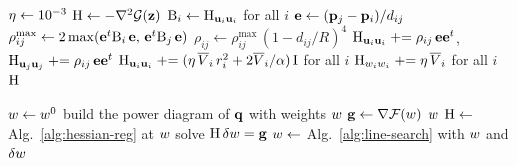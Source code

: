 \documentclass[main.tex]{subfiles}
\begin{document}
\begin{algorithm}[H]
  \caption{Regularized negated Hessian of $\jointdual_\alpha$, $\jointdual$, or $\dualenergy$ (\S\ref{sec:implementation}).}
  \label{alg:hessian-reg}
  \begin{algorithmic}[1]
    \Require {}
    \State $\eta \gets 10^{-3}$
    \State $\mathrm{H} \gets -\nabla^2\mathcal{G}(\mathbf{z})$ \Comment{\eqref{eq:appendix-blocks-off}, \eqref{eq:appendix-blocks-diag}}
    \State $\mathrm{B}_i \gets \mathrm{H}_{\mathbf{u}_i\mathbf{u}_i}$ for all $i$ 
      \State $\mathbf{e} \gets (\mathbf{p}_j - \mathbf{p}_i) / d_{ij}$
      \State $\rho^{\max}_{ij} \gets 2 \max(\mathbf{e}^{t}\mathrm{B}_i\,\mathbf{e},\, \mathbf{e}^{t}\mathrm{B}_j\,\mathbf{e})$
      \State $\rho_{ij} \gets \rho^{\max}_{ij}\,(1 - d_{ij}/R)^4$ \Comment{\eqref{eq:results-pair-reg}}
      \State $\mathrm{H}_{\mathbf{u}_i\mathbf{u}_i} \mathrel{+}= \rho_{ij}\,\mathbf{e}\mathbf{e}^{t}$, \ $\mathrm{H}_{\mathbf{u}_j\mathbf{u}_j} \mathrel{+}= \rho_{ij}\,\mathbf{e}\mathbf{e}^{t}$
    \EndFor
    \State $\mathrm{H}_{\mathbf{u}_i\mathbf{u}_i} \mathrel{+}= (\eta\,\overline{V}_i\,r_i^2 + 2\overline{V}_i/\alpha)\,\mathrm{I}$ for all $i$ 
    \State $\mathrm{H}_{w_iw_i} \mathrel{+}= \eta\,\overline{V}_i$ for all $i$ 
    \State \Return $\mathrm{H}$
  \end{algorithmic}
\end{algorithm}

\begin{algorithm}[H]
  \caption{Newton solve of $\dualenergy$.}
  \label{alg:volume}
  \begin{algorithmic}[1]
    \Require {}
    \State $w \gets w^0$
    \State build the power diagram of $\mathbf{q}$ with weights $w$
      \State $\mathbf{g} \gets \nabla\mathcal{F}(w)$ \Comment{\eqref{eq:volume-dual}}
      \If{$\varepsilon_\weight \le \tol$} \Comment{\eqref{eq:results-termination}}
        \State \Return $w$
      \EndIf
      \State $\mathrm{H} \gets$ Alg.~\ref{alg:hessian-reg} at $w$ 
      \State solve $\mathrm{H}\,\delta w = \mathbf{g}$
      \State $w \gets$ Alg.~\ref{alg:line-search} with $w$ and $\delta w$
    \EndFor
  \end{algorithmic}
\end{algorithm}
\end{document}
